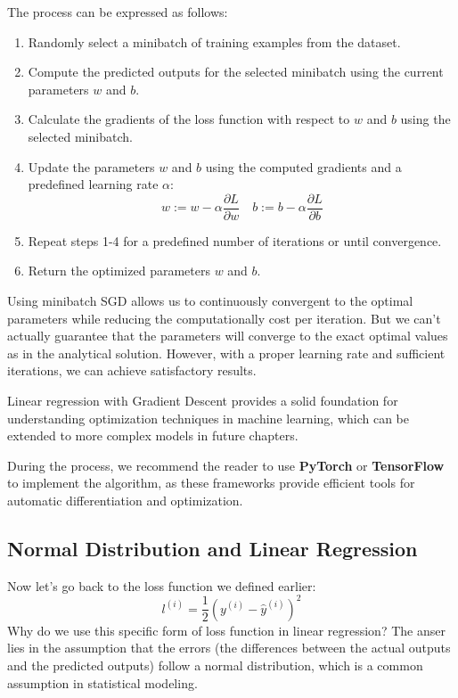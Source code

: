 The process can be expressed as follows:
\begin{enumerate}
    \item Randomly select a minibatch of training examples from the dataset.
    \item Compute the predicted outputs for the selected minibatch using the current parameters \(w\) and \(b\).
    \item Calculate the gradients of the loss function with respect to \(w\) and \(b\) using the selected minibatch.
    \item Update the parameters \(w\) and \(b\) using the computed gradients and a predefined learning rate \(\alpha\):
    \[
    w := w - \alpha \frac{\partial L}{\partial w} \quad
    b := b - \alpha \frac{\partial L}{\partial b}
    \]
    \item Repeat steps 1-4 for a predefined number of iterations or until convergence.
    \item Return the optimized parameters \(w\) and \(b\).
\end{enumerate}

Using minibatch SGD allows us to continuously convergent to the optimal parameters while reducing the computationally cost per iteration. But we can't actually guarantee that the parameters will converge to the exact optimal values as in the analytical solution. However, with a proper learning rate and sufficient iterations, we can achieve satisfactory results.

Linear regression with Gradient Descent provides a solid foundation for understanding optimization techniques in machine learning, which can be extended to more complex models in future chapters.

During the process, we recommend the reader to use \textbf{PyTorch} or \textbf{TensorFlow} to implement the algorithm, as these frameworks provide efficient tools for automatic differentiation and optimization.

\subsection{Normal Distribution and Linear Regression}

Now let's go back to the loss function we defined earlier:
\[
l^{(i)} = \frac{1}{2}(y^{(i)} - \hat{y}^{(i)})^2
\]
Why do we use this specific form of loss function in linear regression? The anser lies in the assumption that the errors (the differences between the actual outputs and the predicted outputs) follow a normal distribution, which is a common assumption in statistical modeling.

